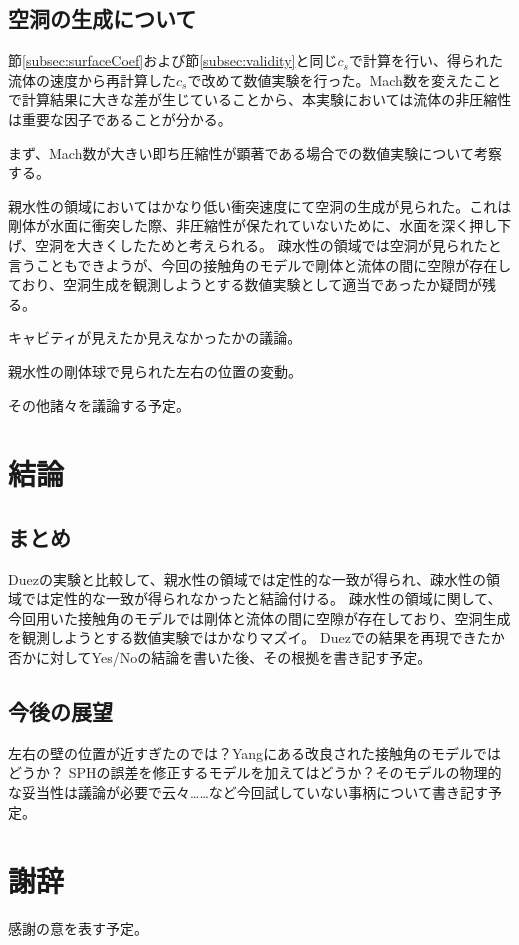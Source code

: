 \documentclass[]{jsarticle}
\begin{document}
\subsection{空洞の生成について}
\label{subsec:discCavityForm}
節\ref{subsec:surfaceCoef}および節\ref{subsec:validity}と同じ$c_s$で計算を行い、得られた流体の速度から再計算した$c_s$で改めて数値実験を行った。Mach数を変えたことで計算結果に大きな差が生じていることから、本実験においては流体の非圧縮性は重要な因子であることが分かる。

まず、Mach数が大きい即ち圧縮性が顕著である場合での数値実験について考察する。

親水性の領域においてはかなり低い衝突速度にて空洞の生成が見られた。これは剛体が水面に衝突した際、非圧縮性が保たれていないために、水面を深く押し下げ、空洞を大きくしたためと考えられる。
疎水性の領域では空洞が見られたと言うこともできようが、今回の接触角のモデルで剛体と流体の間に空隙が存在しており、空洞生成を観測しようとする数値実験として適当であったか疑問が残る。


キャビティが見えたか見えなかったかの議論。

親水性の剛体球で見られた左右の位置の変動。

その他諸々を議論する予定。
\newpage
\section{結論}
\subsection{まとめ}
Duezの実験と比較して、親水性の領域では定性的な一致が得られ、疎水性の領域では定性的な一致が得られなかったと結論付ける。
疎水性の領域に関して、今回用いた接触角のモデルでは剛体と流体の間に空隙が存在しており、空洞生成を観測しようとする数値実験ではかなりマズイ。
Duez\cite{Duez2007}での結果を再現できたか否かに対してYes/Noの結論を書いた後、その根拠を書き記す予定。
\subsection{今後の展望}
左右の壁の位置が近すぎたのでは？Yang\cite{Yang2017}にある改良された接触角のモデルではどうか？
SPHの誤差を修正するモデルを加えてはどうか？そのモデルの物理的な妥当性は議論が必要で云々……など今回試していない事柄について書き記す予定。
\newpage

\section{謝辞}
感謝の意を表す予定。
\newpage



\end{document}
